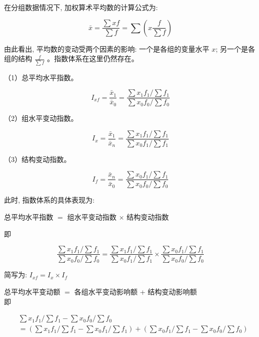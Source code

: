 \documentclass[10pt]{article}
\begin{document}
\begin{CJK*}{UTF8}{bsmi}
在分组数据情况下, 加权算术平均数的计算公式为:

$$
\bar{x}=\frac{\sum x f}{\sum f}=\sum\left(x \frac{f}{\sum f}\right)
$$

由此看出, 平均数的变动受两个因素的影响: 一个是各组的变量水平 $x$; 另一个是各组的结构 $\frac{f}{\sum f}$ 。指数体系在这里仍然存在。

（1）总平均水平指数。


\begin{equation*}
I_{x f}=\frac{\bar{x}_{1}}{\bar{x}_{0}}=\frac{\sum x_{1} f_{1} / \sum f_{1}}{\sum x_{0} f_{0} / \sum f_{0}} \tag{14.16}
\end{equation*}


（2）组水平变动指数。


\begin{equation*}
I_{x}=\frac{\bar{x}_{1}}{\bar{x}_{n}}=\frac{\sum x_{1} f_{1} / \sum f_{1}}{\sum x_{0} f_{1} / \sum f_{1}} \tag{14.17}
\end{equation*}


（3）结构变动指数。


\begin{equation*}
I_{f}=\frac{\bar{x}_{n}}{\bar{x}_{0}}=\frac{\sum x_{0} f_{1} / \sum f_{1}}{\sum x_{0} f_{0} / \sum f_{0}} \tag{14.18}
\end{equation*}


此时, 指数体系的具体表现为:

总平均水平指数 $=$ 组水平变动指数 $\times$ 结构变动指数

即


\begin{equation*}
\frac{\sum x_{1} f_{1} / \sum f_{1}}{\sum x_{0} f_{0} / \sum f_{0}}=\frac{\sum x_{1} f_{1} / \sum f_{1}}{\sum x_{0} f_{1} / \sum f_{1}} \times \frac{\sum x_{0} f_{1} / \sum f_{1}}{\sum x_{0} f_{0} / \sum f_{0}} \tag{14.19}
\end{equation*}


简写为: $I_{x f}=I_{x} \times I_{f}$

总平均水平变动额 $=$ 各组水平变动影响额 + 结构变动影响额\\
即


\begin{align*}
& \sum x_{1} f_{1} / \sum f_{1}-\sum x_{0} f_{0} / \sum f_{0} \\
& =\left(\sum x_{1} f_{1} / \sum f_{1}-\sum x_{0} f_{1} / \sum f_{1}\right)+\left(\sum x_{0} f_{1} / \sum f_{1}-\sum x_{0} f_{0} / \sum f_{0}\right) \tag{14.20}
\end{align*}



\end{CJK*}
\end{document}
